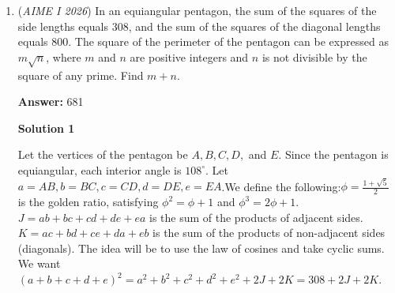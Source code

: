 \begin{enumerate}
 Now, consider $(1+x)^{10000} \pmod{x^{502} - 1}$. We only require $S_r$ after reduction. Then, we rewrite as

 
 \[(1+x)^{10000}=\sum_{k=0}^{10000}\binom{10000}{k}x^k\]
 \[(1+x)^{10000}=\sum_{r=0}^{501}\sum_{m\ge0}\binom{10000}{502m+r}x^{502m+r}\].

 We can do this as each $k$ is dependent on the value $r$, varying from 0 to 501. Note that this modulo $x^{502}-1$ reduces $x^{502m+r}$ to $x^r$, and the inner sum is exactly $S_r$. Therefore,

 
 \[(1+x)^{10000}=\sum_{r=0}^{501}S_rx^{r} \pmod{x^{502}-1}\].

 Note that through Euclidean Algorithm, $10000 = 19 \cdot 502 + 462$. So, $(1+x)^{10000}= (1+x)^{502^{19}} \cdot (1+x)^{462}$. Note that through Fermat's Little Theorem, $(1+x)^{502^{19}} \equiv 1^{19} \pmod{503} = 1$, so we just consider $(1+x)^{462} \pmod{503}$. That is exactly $(1+x)^{462} = \sum_{r=0}^{462} \binom{462}{r}x^r$. We simplify this the same way as before with $(1+x)^{10000}$. Now note that the modulus $503$ is greater than 462 and all $r < 502$, residues will only change if $x^r$ has a power greater than 502 (or 503). Therefore, in exact terminology we have corresponded $\binom{462}{r}$ to the remainder when $S_r$ is divided by 503. Obviously, the interval $[463, 501]$ yields $0 \pmod{503}$, so we have $\boxed{39}$ solutions.

 


	\item (\textit{AIME I 2026}) In an equiangular pentagon, the sum of the squares of the side lengths equals $308$, and the sum of the squares of the diagonal lengths equals $800$. The square of the perimeter of the pentagon can be expressed as $m\sqrt{n}$, where $m$ and $n$ are positive integers and $n$ is not divisible by the square of any prime. Find $m+n$.


 
 \textbf{Answer: }681



\textbf{Solution 1}

Let the vertices of the pentagon be $A, B, C, D,$ and $E$. Since the pentagon is equiangular, each interior angle is $108^\circ$. Let $a=AB, b=BC, c=CD, d=DE, e=EA$.We define the following:$\phi = \frac{1+\sqrt{5}}{2}$ is the golden ratio, satisfying $\phi^2 = \phi + 1$ and $\phi^3 = 2\phi + 1$.$J = ab+bc+cd+de+ea$ is the sum of the products of adjacent sides. $K = ac+bd+ce+da+eb$ is the sum of the products of non-adjacent sides (diagonals). The idea will be to use the law of cosines and take cyclic sums. We want $(a+b+c+d+e)^2 = a^2 + b^2 + c^2 + d^2 + e^2 + 2J + 2K = 308 + 2J + 2K$.


\end{enumerate}
